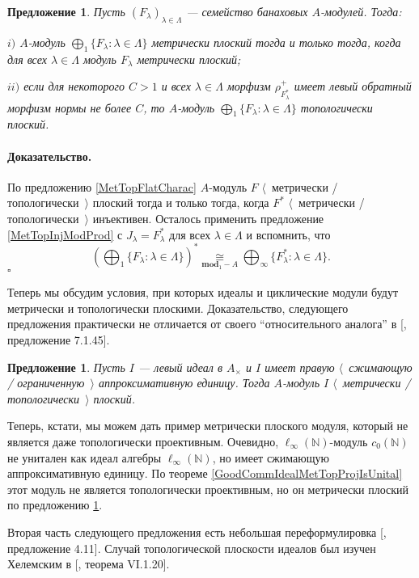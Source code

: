 \documentclass[12pt]{article}
\newcommand{\isom}[1]{\mathop{\mathbin{\cong}}\limits_{#1}}
\newtheorem{proposition}[theorem]{Предложение}
\renewenvironment{proof}{\paragraph{Доказательство.}}{\hfill$\square$\medskip}
\begin{document}
\begin{proposition}\label{MetTopFlatModCoProd} Пусть $(F_\lambda)_{\lambda\in\Lambda}$ --- семейство банаховых $A$-модулей. Тогда: 

$i)$ $A$-модуль $\bigoplus_1\{F_\lambda:\lambda\in\Lambda\}$ метрически плоский тогда и только тогда, когда для всех $\lambda\in\Lambda$ модуль $F_\lambda$ метрически плоский;

$ii)$ если для некоторого $C>1$ и всех $\lambda\in\Lambda$ морфизм $\rho_{F_\lambda^*}^+$ имеет левый обратный морфизм нормы не более $C$, то $A$-модуль $\bigoplus_1\{F_\lambda:\lambda\in\Lambda\}$ топологически плоский.
\end{proposition}
\begin{proof} По предложению \ref{MetTopFlatCharac} $A$-модуль $F$ $\langle$~метрически / топологически~$\rangle$ плоский тогда и только тогда, когда $F^*$ $\langle$~метрически / топологически~$\rangle$ инъективен. Осталось применить предложение \ref{MetTopInjModProd} с $J_\lambda=F_\lambda^*$ для всех $\lambda\in\Lambda$ и вспомнить, что 
$$
\left(\bigoplus\nolimits_1\{ F_\lambda:\lambda\in\Lambda\}\right)^*\isom{\mathbf{mod}_1-A}\bigoplus\nolimits_\infty\{ F_\lambda^*:\lambda\in\Lambda\}.
$$
\end{proof}

Теперь	 мы обсудим условия, при которых идеалы и циклические модули будут метрически и топологически плоскими. Доказательство, следующего предложения практически не отличается от своего ``относительного аналога'' в [\cite{HelBanLocConvAlg}, предложение 7.1.45].

\begin{proposition}\label{MetTopFlatIdealsInUnitalAlg} Пусть $I$ --- левый идеал в $A_\times $ и $I$ имеет правую $\langle$~сжимающую / ограниченную~$\rangle$ аппроксимативную единицу. Тогда $A$-модуль $I$ $\langle$~метрически / топологически~$\rangle$ плоский.
\end{proposition}

Теперь, кстати, мы можем дать пример метрически плоского модуля, который не является даже топологически проективным. Очевидно, $\ell_\infty(\mathbb{N})$-модуль $c_0(\mathbb{N})$ не унитален как идеал алгебры $\ell_\infty(\mathbb{N})$, но имеет сжимающую аппроксимативную единицу. По теореме \ref{GoodCommIdealMetTopProjIsUnital} этот модуль не является топологически проективным, но он метрически плоский по предложению \ref{MetTopFlatIdealsInUnitalAlg}.

Вторая часть следующего предложения есть небольшая переформулировка [\cite{WhiteInjmoduAlg}, предложение 4.11]. Случай топологической плоскости идеалов был изучен Хелемским в [\cite{HelHomolBanTopAlg}, теорема VI.1.20].
\end{document}
